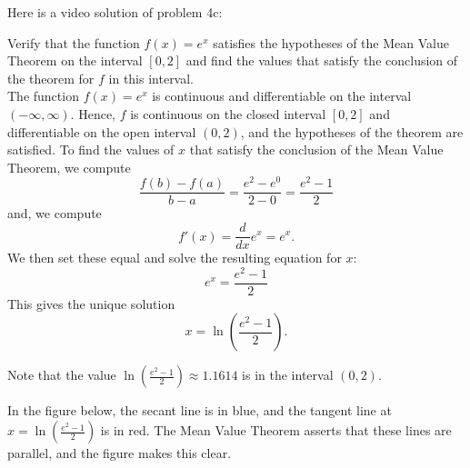 \documentclass[handout]{ximera}
\begin{document}
Here is a video solution of  problem 4c:
\begin{foldable}
\end{foldable}

\begin{example}[example 5]
Verify that the function $f(x) = e^x$ satisfies the hypotheses of the Mean Value Theorem
on the interval $[0,2]$ and find the values that satisfy the conclusion of the theorem for $f$ in this interval.\\
The function $f(x) = e^x$ is continuous and differentiable on the interval $(-\infty, \infty)$. 
Hence, $f$ is continuous on the closed interval $[0, 2]$ and differentiable on the open interval $(0, 2)$, and the hypotheses of the theorem are satisfied.
To find the values of $x$ that satisfy the conclusion of the Mean Value Theorem, we compute
\[\frac{f(b) - f(a)}{b-a} = \frac{e^2 - e^0}{2-0} = \frac{e^2 - 1}{2}\]
and, we compute
\[f'(x) = \frac{d}{dx} e^x = e^x.\]
We then set these equal and solve the resulting equation for $x$:
\[e^x = \frac{e^2 - 1}{2}\]
This gives the unique solution
\[ x = \ln(\frac{e^2 - 1}{2}).\]

Note that the value $\ln(\frac{e^2 - 1}{2}) \approx 1.1614$ is in the interval $(0,2)$.

In the figure below, the secant line is in blue, 
and the tangent line at $x = \ln(\frac{e^2 - 1}{2})$ is in red. The Mean Value Theorem asserts that these lines are parallel, and the figure makes this clear.

\begin{image}
\end{image}

\end{example}
\end{document}
